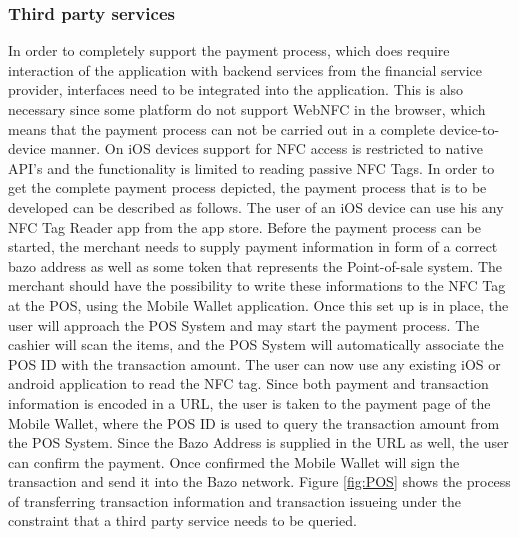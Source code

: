 \documentclass[a4paper]{article}
\begin{document}
\subsubsection{Third party services}
In order to completely support the payment process, which does require interaction of the application with backend services from the financial service provider, interfaces need to be integrated into the application.
This is also necessary since some platform do not support WebNFC in the browser, which means that the payment process can not be carried out in a complete device-to-device manner. On iOS devices support for NFC access is restricted to native API's and the functionality is limited to reading passive NFC Tags.
In order to get the complete payment process depicted, the payment process that is to be developed can be described as follows. The user of an iOS device can use his any NFC Tag Reader app from the app store. Before the payment process can be started, the merchant needs to supply payment information in form of a correct bazo address as well as some token that represents the Point-of-sale system. The merchant should have the possibility to write these informations to the NFC Tag at the POS, using the Mobile Wallet application.
Once this set up is in place, the user will approach the POS System and may start the payment process. The cashier will scan the items, and the POS System will automatically associate the POS ID with the transaction amount. The user can now use any existing iOS or android application to read the NFC tag. Since both payment and transaction information is encoded in a URL, the user is taken to the payment page of the Mobile Wallet, where the POS ID is used to query the transaction amount from the POS System. Since the Bazo Address is supplied in the URL as well, the user can confirm the payment. Once confirmed the Mobile Wallet will sign the transaction and send it into the Bazo network. Figure
\ref{fig:POS} shows the process of transferring transaction information and transaction issueing under the constraint that a third party service needs to be queried.
\end{document}
